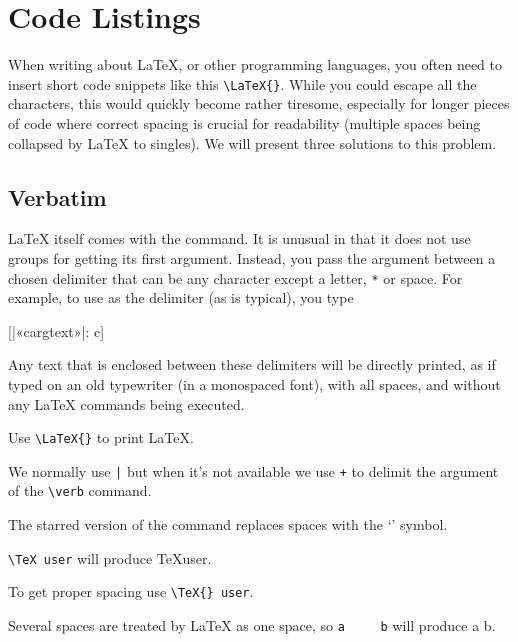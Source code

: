 \section{Code Listings}\label{sec:code_listings}

When writing about \LaTeX{}, or other programming languages, you often need to
insert short code snippets like this \verb|\LaTeX{}|. While you could escape
all the characters, this would quickly become rather tiresome, especially for
longer pieces of code where correct spacing is crucial for readability
(multiple spaces being collapsed by \LaTeX{} to singles).
We will present three solutions to this problem.

\subsection{Verbatim}\label{sec:verbatim}

\LaTeX{} itself comes with the  command. It is unusual in that it does
not use groups for getting its first argument. Instead, you pass the argument
between a chosen delimiter that can be any character except a letter, \verb|*|
or space. For example, to use \cargv{|} as the delimiter (as is typical),
you type
\begin{lscommand}
  [|«\bs carg{text}»|: c]
\end{lscommand}
Any text that is enclosed between these delimiters will be directly printed, as
if typed on an old typewriter (in a monospaced font), with all spaces, and without any \LaTeX{} commands
being executed.
\begin{example}
Use \verb|\LaTeX{}| to
print \LaTeX.

We normally use \verb+|+ but
when it's not available we
use \verb|+| to delimit the
argument of the \verb|\verb|
command.
\end{example}

The starred version of the  command replaces spaces with the
\enquote*{\textvisiblespace{}} symbol.

\begin{chktexignore}
\begin{example}
\verb*|\TeX user| will
produce \TeX user.

To get proper spacing use
\verb*|\TeX{} user|.

Several spaces are treated
by \LaTeX{} as one space,
so \verb*|a     b| will
produce a     b.
\end{example}
\end{chktexignore}


